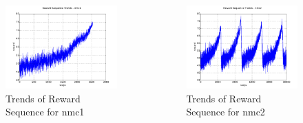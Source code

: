 \documentclass[compress]{beamer}
\begin{document}
\begin{frame}
\begin{columns}
\begin{figure}[htb!]
\centering
\includegraphics[width=1.0\textwidth]{trends_nmc1.pdf}
\caption{\label{fig:trends_nmc1}Trends of Reward Sequence for nmc1}
\end{figure}
\begin{figure}[htb!]
\centering
\includegraphics[width=1.0\textwidth]{trends_nmc2.pdf}
\caption{\label{fig:trends_nmc2}Trends of Reward Sequence for nmc2}
\end{figure}
\end{columns}
\end{frame}
\end{document}
